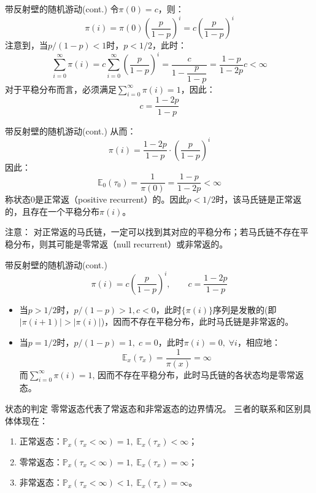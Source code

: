 \documentclass[t]{beamer}
\renewcommand{\Pr}{\mathbb{P}}
\newcommand{\E}{\mathbb{E}}
\begin{document}
\begin{frame}{带反射壁的随机游动(cont.)}
    令$\pi(0)=c$，则：
    \[\pi(i)=\pi(0)\left(\frac{p}{1-p}\right)^i =c\left(\frac{p}{1-p}\right)^i \]
    注意到，当$p/(1-p)<1$时，$p<1/2$，此时：
    \[\sum_{i=0}^{\infty}\pi(i)=c\sum_{i=0}^{\infty}\left(\frac{p}{1-p}\right)^i=\frac{c}{1-\dfrac{p}{1-p}}=\frac{1-p}{1-2p}c<\infty \]
    对于平稳分布而言，必须满足$\displaystyle\sum_{i=0}^{\infty}\pi(i)=1$，因此：
    \[c=\frac{1-2p}{1-p} \]
\end{frame}


\begin{frame}{带反射壁的随机游动(cont.)}
    从而：\[\pi(i)=\frac{1-2p}{1-p}\cdot \left(\frac{p}{1-p}\right)^i \]
    因此：$$\E_0(\tau_0)=\frac{1}{\pi(0)}=\frac{1-p}{1-2p}<\infty $$
    称状态0是{正常返}（positive recurrent）的。因此$p<1/2$时，该马氏链是正常返的，且存在一个平稳分布$\pi(i)$。

    \begin{block}{注意：}
       对正常返的马氏链，一定可以找到其对应的平稳分布；若马氏链不存在平稳分布，则其可能是零常返（null recurrent）或非常返的。
    \end{block}
\end{frame}


\begin{frame}{带反射壁的随机游动(cont.)}
\[\pi(i)=c\left(\frac{p}{1-p}\right)^i,\qquad c=\frac{1-2p}{1-p} \]

\begin{itemize}
    \item 当$p>1/2$时，$p/(1-p)>1, c<0$，此时$\{\pi(i)\}$序列是发散的(即 $|\pi(i+1)|>|\pi(i)|$)，因而不存在平稳分布，此时马氏链是{非常返}的。
    \item 当$p=1/2$时，$p/(1-p)=1,\; c=0$，此时$\pi(i)=0,\; \forall i$，相应地：
        $$\E_x(\tau_x)=\frac{1}{\pi(x)}=\infty$$
    而$\displaystyle\sum_{i=0}^{\infty}\pi(i)=1$, 
        因而不存在平稳分布，此时马氏链的各状态均是{零常返}态。
\end{itemize}
\end{frame}


\begin{frame}{状态的判定}
    零常返态代表了常返态和非常返态的边界情况。
    三者的联系和区别具体体现在：
    \begin{enumerate}
        \item 正常返态：$\Pr_x(\tau_x<\infty)=1, \; \E_x(\tau_x)<\infty$；
    \item	零常返态：$\Pr_x(\tau_x<\infty)=1, \;\E_x(\tau_x)=\infty$；
    \item 非常返态：$\Pr_x(\tau_x<\infty)<1, \;\E_x(\tau_x)=\infty$。
    \end{enumerate}
\end{frame}
\end{document}
